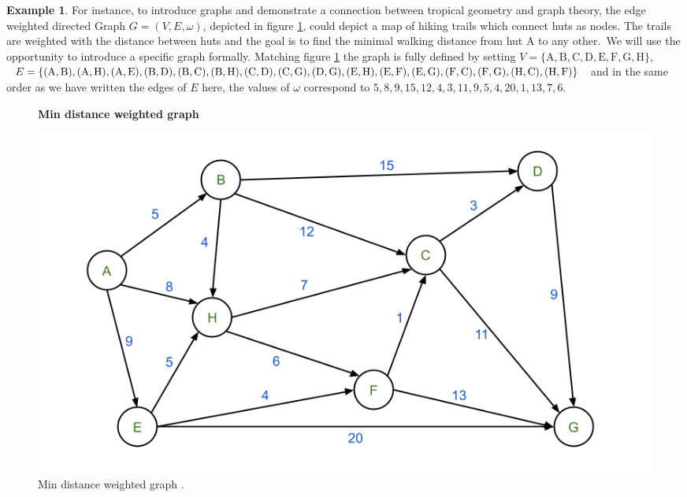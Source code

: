 \documentclass{article}
\theoremstyle{definition}
\newtheorem{example}[theorem]{Example}
\newcommand*{\figuretitle}[1]{%
    {\centering%
    \textbf{#1}%
    \par\medskip}%
}
\begin{document}
\begin{example}
For instance, to introduce graphs and demonstrate a connection between tropical geometry and graph theory, the edge weighted directed Graph $G = (V, E, \omega)$, depicted in figure \ref{fig:mindDistGraph}, could depict a map of hiking trails which connect huts as nodes. The trails are weighted with the distance between huts and the goal is to find the minimal walking distance from hut A to any other.\
We will use the opportunity to introduce a specific graph formally. Matching figure \ref{fig:mindDistGraph} the graph is fully defined by setting $V=\{\text{A}, \text{B}, \text{C}, \text{D}, \text{E}, \text{F}, \text{G}, \text{H}\}$, $E=\{(\text{A}, \text{B}), (\text{A}, \text{H}), (\text{A}, \text{E}), (\text{B}, \text{D}), \\ (\text{B}, \text{C}), (\text{B}, \text{H}), (\text{C}, \text{D}), (\text{C}, \text{G}), (\text{D}, \text{G}), (\text{E}, \text{H}), (\text{E}, \text{F}), (\text{E}, \text{G}), (\text{F}, \text{C}), (\text{F}, \text{G}), (\text{H}, \text{C}), \\ (\text{H}, \text{F})\}$ and in the same order as we have written the edges of $E$ here, the values of $\omega$ correspond to $5, 8, 9, 15, 12, 4, 3, 11, 9, 5, 4, 20, 1, 13, 7, 6$.

\begin{figure}[H]
\centering
\figuretitle{Min distance weighted graph}
\includegraphics[scale=0.8]{graphics/weighted_directed_graph_2.png}
\caption{Min distance weighted graph \cite{dijacGraph20}.}
\label{fig:mindDistGraph}
\end{figure}


\end{example}
\end{document}
